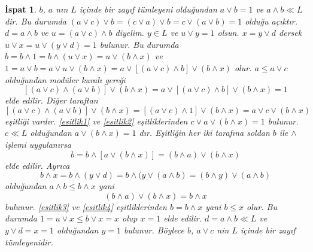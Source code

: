 \documentclass[a4paper,12pt]{article}
\numberwithin{equation}{section}
\theoremstyle{italik}
\newtheorem*{ispat}{İspat}
\begin{document}
\begin{ispat}
\noindent $ b $, $ a $ nın $ L $ içinde bir zayıf tümleyeni olduğundan $ a \vee b = 1 $ ve $ a \wedge b \ll L $ dir. Bu durumda 
$ ( a \vee c ) \vee b = ( c \vee a ) \vee b = c \vee ( a \vee b ) = 1 $ olduğu açıktır. $ d = a \wedge b $ ve $ u = ( a \vee c ) \wedge b $ 
diyelim. $ y \in L $ ve $ u \vee y = 1 $ olsun. $ x = y \vee d $ dersek $ u \vee x = u \vee ( y \vee d ) = 1 $ bulunur. Bu durumda 
$ b = b \wedge 1 = b \wedge ( u \vee x ) = u \vee ( b \wedge x ) $ ve 
$ 1 = a \vee b = a \vee u \vee ( b \wedge x ) = a \vee [ ( a \vee c ) \wedge b ] \vee ( b \wedge x ) $ olur. $ a \leq a \vee c $ 
olduğundan modüler kuralı gereği 
\begin{equation}\label{esitlik1}
 [ (a \vee c )  \wedge ( a \vee b ) ] \vee ( b \wedge x ) = a \vee [ ( a \vee c ) \wedge b ] \vee ( b \wedge x )  =  1
\end{equation}
elde edilir. Diğer taraftan
\begin{equation}\label{esitlik2}
[ (a \vee c )  \wedge ( a \vee b ) ] \vee ( b \wedge x ) = [(a \vee c ) \wedge 1 ] \vee ( b \wedge x ) = a \vee c \vee ( b \wedge x )
\end{equation}
eşitliği vardır. \eqref{esitlik1} ve \eqref{esitlik2} eşitliklerinden $ c \vee a \vee ( b \wedge x ) = 1 $ bulunur. $ c \ll L $ olduğundan $ a \vee ( b \wedge x ) = 1 $ dır. 
Eşitliğin her iki tarafına soldan $ b $ ile $ \wedge $ işlemi uygulanırsa 
\begin{equation}\label{esitlik3}
 b = b \wedge [ a \vee ( b \wedge x ) ] = ( b \wedge a ) \vee ( b \wedge x)
\end{equation}
elde edilir. Ayrıca 
\[ b \wedge x = b \wedge ( y \vee d ) =  b \wedge ( y \vee ( a \wedge b ) = ( b \wedge y ) \vee (a \wedge b ) \]
olduğundan $ a \wedge b \leq b \wedge x $ yani 
\begin{equation}\label{esitlik4}
 ( b \wedge a )\vee ( b \wedge x ) = b \wedge x
\end{equation}
bulunur. \eqref{esitlik3} ve \eqref{esitlik4} eşitliklerinden $ b = b \wedge x $ yani $ b \leq x $ olur. Bu durumda  
$ 1 = u \vee x \leq b \vee x = x $ olup $ x = 1 $ elde edilir. $ d = a \wedge b \ll L $ ve $ y \vee d = x = 1 $ olduğundan 
$ y = 1 $ bulunur. Böylece $ b $, $ a \vee c $ nin $ L $ içinde bir zayıf tümleyenidir.
\end{ispat}
\end{document}
